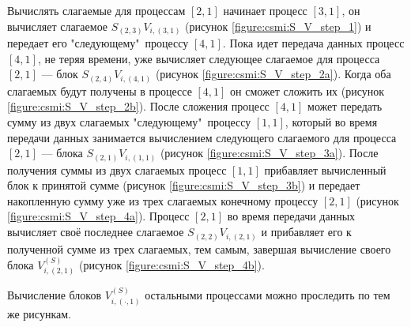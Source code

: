 Вычислять слагаемые для процессам $[2,1]$ начинает процесс $[3,1]$, он вычисляет слагаемое $S_{(2,3)} V_{i,(3,1)}$ (рисунок \ref{figure:csmi:S_V_step_1}) и
передает его "следующему"\ процессу $[4,1]$. Пока идет передача данных процесс $[4,1]$, не теряя времени, уже вычисляет следующее слагаемое для процесса $[2,1]$ --- блок
$S_{(2,4)} V_{i,(4,1)}$ (рисунок \ref{figure:csmi:S_V_step_2a}). Когда оба слагаемых будут получены в процессе $[4,1]$ он сможет сложить их
(рисунок \ref{figure:csmi:S_V_step_2b}). После сложения процесс $[4,1]$ может передать сумму из двух слагаемых "следующему"\ процессу $[1,1]$, который во время передачи данных
занимается вычислением следующего слагаемого для процесса $[2,1]$ --- блока $S_{(2,1)} V_{i,(1,1)}$ (рисунок \ref{figure:csmi:S_V_step_3a}). После получения суммы
из двух слагаемых процесс $[1,1]$ прибавляет вычисленный блок к принятой сумме (рисунок \ref{figure:csmi:S_V_step_3b}) и передает накопленную сумму уже из трех
слагаемых конечному процессу $[2,1]$ (рисунок \ref{figure:csmi:S_V_step_4a}). Процесс $[2,1]$ во время передачи данных вычисляет своё последнее слагаемое
$S_{(2,2)} V_{i,(2,1)}$ и прибавляет его к полученной сумме из трех слагаемых, тем самым, завершая вычисление своего блока $V_{i,(2,1)}^{(S)}$ (рисунок
\ref{figure:csmi:S_V_step_4b}).

Вычисление блоков $V_{i,(\cdot,1)}^{(S)}$ остальными процессами можно проследить по тем же рисункам.

